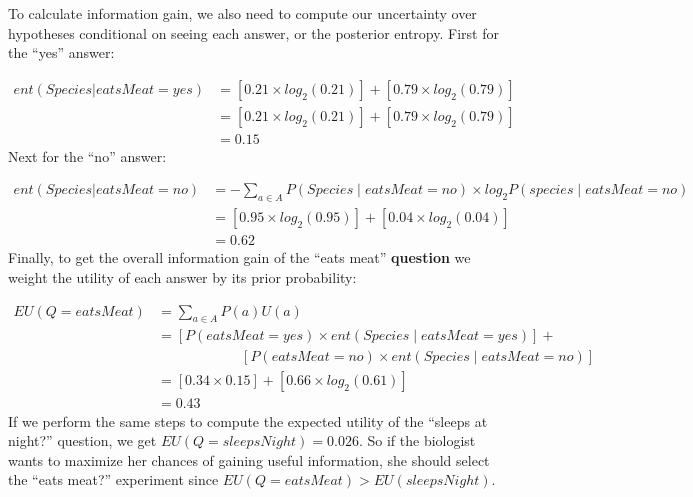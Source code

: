 \documentclass[english,floatsintext,man]{apa6}
\theoremstyle{definition}
\theoremstyle{definition}
\theoremstyle{definition}
\theoremstyle{remark}
\begin{document}
\noindent
To calculate information gain, we also need to compute our uncertainty
over hypotheses conditional on seeing each answer, or the posterior
entropy. First for the \enquote{yes} answer:

\[ 
\begin{aligned}
ent(Species|eatsMeat = yes) &= [0.21 \times log_2(0.21)] + [0.79 \times log_2(0.79)]\\
 &= [0.21 \times log_2(0.21)] + [0.79 \times log_2(0.79)]\\
 &=  0.15
\end{aligned}
\] \noindent
Next for the \enquote{no} answer:

\[ 
\begin{aligned}
ent(Species|eatsMeat = no) &= -\sum_{a\in A}{P(Species \mid eatsMeat = no) \times log_2P(species \mid eatsMeat = no)}\\
&= [0.95 \times log_2(0.95)] + [0.04 \times log_2(0.04)]\\
&=  0.62
\end{aligned}
\] \noindent
Finally, to get the overall information gain of the \enquote{eats meat}
\textbf{question} we weight the utility of each answer by its prior
probability:

\[ 
\begin{aligned}
EU(Q = eatsMeat) &= \sum_{a\in A}{P(a)U(a)} \\
&= [P(eatsMeat = yes) \times ent(Species \mid eatsMeat = yes)] + \\& \qquad \qquad \qquad [P(eatsMeat = no) \times ent(Species \mid eatsMeat = no)]\\
&= [0.34 \times 0.15] + [0.66 \times log_2(0.61)]\\
&= 0.43
\end{aligned}
\] If we perform the same steps to compute the expected utility of the
\enquote{sleeps at night?} question, we get
\(EU(Q = sleepsNight) = 0.026\). So if the biologist wants to maximize
her chances of gaining useful information, she should select the
\enquote{eats meat?} experiment since
\(EU(Q = eatsMeat) > EU(sleepsNight)\).
\end{document}
